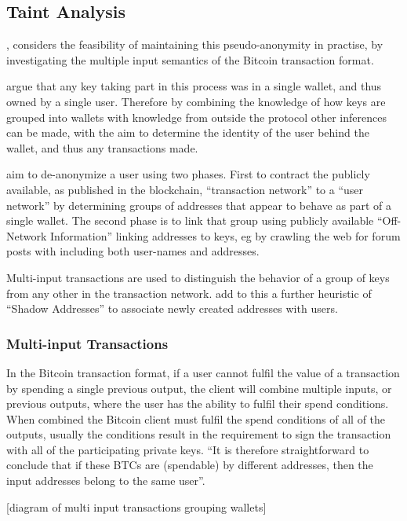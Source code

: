 \subsection{Taint Analysis} \textcite{reid-anon}, considers the feasibility of maintaining this pseudo-anonymity in practise, by investigating the multiple input semantics of the Bitcoin transaction format. 

\textcite{reid-anon} argue that any key taking part in this process was in a single wallet, and thus owned by a single user. Therefore by combining the knowledge of how keys are grouped into wallets with knowledge from outside the protocol other inferences can be made, with the aim to determine the identity of the user behind the wallet, and thus any transactions made.

\textcite{reid-anon} aim to de-anonymize a user using two phases.  First to contract the publicly available, as published in the blockchain, ``transaction network'' to a ``user network'' by determining groups of addresses that appear to behave as part of a single wallet.  The second phase is to  link that group using publicly available ``Off-Network Information'' linking addresses to keys, eg by crawling the web for forum posts with including both user-names and addresses.

Multi-input transactions are used to distinguish the behavior of a group of keys from any other in the transaction network.  \textcite{eval-priv} add to this a further heuristic of ``Shadow Addresses'' to associate newly created addresses with users.

\subsubsection{Multi-input Transactions}
In the Bitcoin transaction format, if a user cannot fulfil the value of a transaction by spending a single previous output, the client will combine multiple inputs, or previous outputs, where the user has the ability to fulfil their spend conditions.  When combined the Bitcoin client must fulfil the spend conditions of all of the outputs, usually the conditions result in the requirement to sign the transaction with all of the participating private keys.  ``It is therefore straightforward to conclude that if these BTCs are (spendable) by different addresses, then the input addresses belong to the same user''\cite{eval-priv}.

[diagram of multi input transactions grouping wallets]

